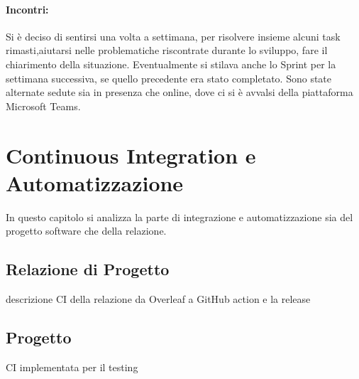     \paragraph{Incontri: }
    Si è deciso di sentirsi una volta a settimana, per risolvere insieme alcuni task rimasti,aiutarsi nelle problematiche riscontrate durante lo sviluppo, fare il chiarimento della situazione. Eventualmente si stilava anche lo Sprint per la settimana successiva, se quello precedente era stato completato. Sono state alternate sedute sia in presenza che online, dove ci si è avvalsi della piattaforma Microsoft Teams.
    
     

\section{Continuous Integration e Automatizzazione}
\label{chap:CI}
In questo capitolo si analizza la parte di integrazione e automatizzazione sia del progetto software che della relazione. 
    \subsection{Relazione di Progetto}
        descrizione CI della relazione da Overleaf a GitHub action e la release

    \subsection{Progetto}
        CI implementata per il testing 
        
        






